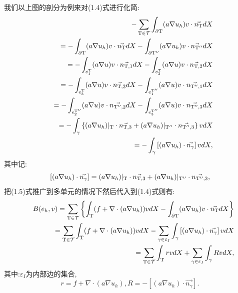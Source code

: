 \documentclass[9pt, a4paper,eqno]{article}
\theoremstyle{plain}
\begin{document}
\begin{CJK}{UTF8}{gkai}
我们以上图的剖分为例来对(1.4)式进行化简:
\begin{eqnarray}
&&- \sum_{ \rm T \in \mathcal{T} }  \int _{\partial \rm T} (a \nabla u_{h}) v \cdot \vec{n_{\rm T}} dX 
\nonumber\\&& = - \int _{\partial \rm T} (a \nabla u_{h}) v \cdot \vec{n_{\rm T}} dX -  \int _{\partial \rm T^{\prime\prime}} (a \nabla u_{h}) v \cdot \vec{n_{\rm T^{\prime\prime}}} dX 
\nonumber\\&& = - \int _{e_{1}^{\rm T}} (a \nabla u)v \cdot \vec{n_{\rm T , 1}} dX -  \int _{e_{2}^{\rm T}} (a \nabla u)v \cdot \vec{n_{\rm T , 2}} dX
\nonumber\\&& = - \int _{e_{3}^{\rm T}} (a \nabla u)v \cdot \vec{n_{\rm T , 3}} dX -  \int _{e_{1}^{\rm T^{\prime\prime}}} (a \nabla u)v \cdot \vec{n_{\rm T^{\prime\prime} , 1}} dX
\nonumber\\&& =  - \int _{e_{2}^{\rm T^{\prime\prime}}} (a \nabla u)v \cdot \vec{n_{\rm T^{\prime\prime} , 2}} dX -  \int _{e_{3}^{\rm T^{\prime\prime}}} (a \nabla u)v \cdot \vec{n_{\rm T^{\prime\prime} , 3}} dX
\nonumber\\&& = -\int _{\gamma} \left\lbrace (a\nabla u_{h})| _{\rm T}  \cdot \vec{n_{\rm T , 3}}   + (a\nabla u_{h})| _{\rm T^{\prime\prime}}  \cdot \vec{n_{\rm T^{\prime\prime} , 3}}  \right\rbrace vdX
\nonumber\\&& = -\int _{\gamma} \left[ (a\nabla u_{h}) \cdot \vec{n_{\gamma}} \right]v dX,
\label{A1anotherboun}
\end{eqnarray}
其中记: $$\left[ (a\nabla u_{h}) \cdot \vec{n_{\gamma}} \right] = (a\nabla u_{h})| _{\rm T}  \cdot \vec{n_{\rm T , 3}}  +  (a\nabla u_{h})| _{\rm T^{\prime\prime}}  \cdot \vec{n_{\rm T^{\prime\prime} , 3}} ,$$
把(1.5)式推广到多单元的情况下然后代入到(1.4)式则有:
\begin{eqnarray}
&& B(e_{h},v)=\sum_{ \rm T \in \mathcal{T} }  \left\lbrace  \int _{\rm T } (f+ \nabla \cdot (a \nabla u_{h}) )v dX  - \int _{\partial \rm T} (a \nabla u_{h}) v \cdot \vec{n_{\rm T}} dX \right\rbrace
\nonumber\\&& = \sum_{ \rm T \in \mathcal{T} }   \int _{\rm T } (f+ \nabla \cdot (a \nabla u_{h}) )v dX -         \sum_{ \gamma \in \varepsilon _{I} } \int _{\gamma} \left[ (a\nabla u_{h}) \cdot \vec{n_{\gamma}} \right]v dX
\nonumber\\&& = \sum_{ \rm T \in \mathcal{T} }   \int _{\rm T } rv dX +        \sum_{ \gamma \in \varepsilon _{I} } \int _{\gamma}RvdX,
\label{A1anotherboun}
\end{eqnarray}
其中:$\varepsilon_{I}$为内部边的集合, $$ r =f+ \nabla \cdot (a \nabla u_{h}) , R = -\left[ (a\nabla u_{h}) \cdot \vec{n_{\gamma}} \right] .$$


\end{CJK}
\end{document}

